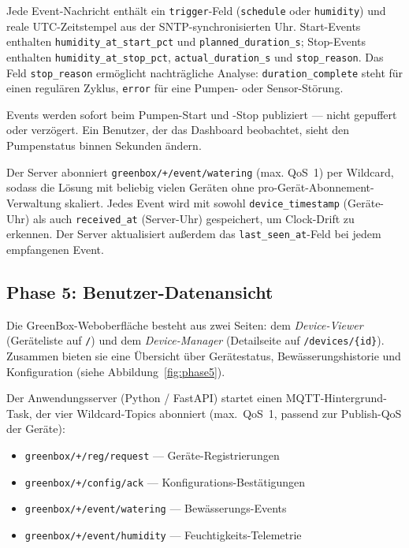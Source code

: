 \documentclass[a4paper,12pt]{article}
\begin{document}
Jede Event-Nachricht enthält ein \texttt{trigger}-Feld
(\texttt{\textquotedbl schedule\textquotedbl} oder
\texttt{\textquotedbl humidity\textquotedbl}) und reale
UTC-Zeitstempel aus der SNTP-synchronisierten Uhr.
Start-Events enthalten \texttt{humidity\_at\_start\_pct} und
\texttt{planned\_duration\_s}; Stop-Events enthalten
\texttt{humidity\_at\_stop\_pct}, \texttt{actual\_duration\_s}
und \texttt{stop\_reason}. Das Feld \texttt{stop\_reason}
ermöglicht nachträgliche Analyse: \texttt{duration\_complete}
steht für einen regulären Zyklus, \texttt{error} für eine
Pumpen- oder Sensor-Störung.

Events werden sofort beim Pumpen-Start und -Stop publiziert ---
nicht gepuffert oder verzögert. Ein Benutzer, der das Dashboard
beobachtet, sieht den Pumpenstatus binnen Sekunden ändern.

Der Server abonniert \texttt{greenbox/+/event/watering} (max.
QoS~1) per Wildcard, sodass die Lösung mit beliebig vielen Geräten
ohne pro-Gerät-Abonnement-Verwaltung skaliert. Jedes Event wird mit
sowohl \texttt{device\_timestamp} (Geräte-Uhr) als auch
\texttt{received\_at} (Server-Uhr) gespeichert, um Clock-Drift
zu erkennen. Der Server aktualisiert außerdem das
\texttt{last\_seen\_at}-Feld bei jedem empfangenen Event.

\subsection{Phase 5: Benutzer-Datenansicht}

Die GreenBox-Weboberfläche besteht aus zwei Seiten: dem
\emph{Device-Viewer} (Geräteliste auf \texttt{/}) und dem
\emph{Device-Manager} (Detailseite auf \texttt{/devices/\{id\}}).
Zusammen bieten sie eine Übersicht über Gerätestatus,
Bewässerungshistorie und Konfiguration (siehe
Abbildung~\ref{fig:phase5}).

Der Anwendungsserver (Python / FastAPI) startet einen
MQTT-Hintergrund-Task, der vier Wildcard-Topics abonniert (max.\
QoS~1, passend zur Publish-QoS der Geräte):

\begin{itemize}
  \item \texttt{greenbox/+/reg/request} --- Geräte-Registrierungen
  \item \texttt{greenbox/+/config/ack} --- Konfigurations-Bestätigungen
  \item \texttt{greenbox/+/event/watering} --- Bewässerungs-Events
  \item \texttt{greenbox/+/event/humidity} --- Feuchtigkeits-Telemetrie
\end{itemize}
\end{document}
